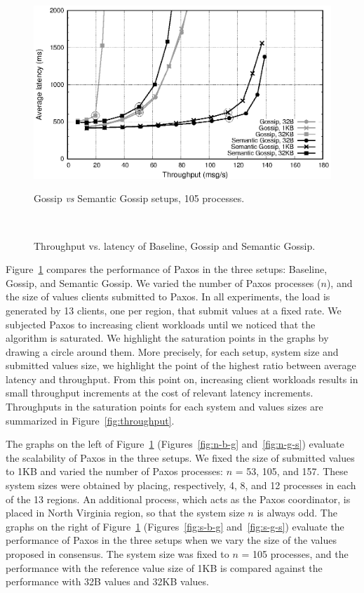 \begin{figure}[!htbp]
\includegraphics[width=\columnwidth]{figures/lat-th-size-gossip-semantic.eps}
\caption{Gossip {\em vs} Semantic Gossip setups, 105 processes.}
\label{fig:s-g-s}
\
\caption{Throughput vs. latency of Baseline, Gossip and Semantic Gossip.}
\label{fig:overall}
\end{figure}

Figure~\ref{fig:overall} compares the performance of Paxos in the three setups:
Baseline, Gossip, and Semantic Gossip.
%
We varied the number of Paxos processes ($n$), and the size of values clients
submitted to Paxos.
%
In all experiments, the load is generated by 13 clients, one per region, that
submit values at a fixed rate.
%
We subjected Paxos to increasing client workloads until we noticed that the
algorithm is saturated.
%
We highlight the saturation points in the graphs by drawing a circle around
them.
More precisely, for each setup, system size and submitted values size, we
highlight the point of the highest ratio between average latency and throughput.
%
From this point on, increasing client workloads results in small throughput
increments at the cost of relevant latency increments.
%
Throughputs in the saturation points for each system and values sizes are
summarized in Figure~\ref{fig:throughput}.

The graphs on the left of Figure~\ref{fig:overall} (Figures~\ref{fig:n-b-g}
and~\ref{fig:n-g-s}) evaluate the scalability of Paxos in the three setups.
We fixed the size of submitted values to 1KB and varied the number of
Paxos processes: $n$ = 53, 105, and 157.
These system sizes were obtained by placing, respectively, 4, 8, and 12
processes in each of the 13 regions.
An additional process, which acts as the Paxos coordinator, is placed in North
Virginia region, so that the system size $n$ is always odd.
%
The graphs on the right of Figure~\ref{fig:overall} (Figures~\ref{fig:s-b-g}
and~\ref{fig:s-g-s}) evaluate the performance of Paxos in the three setups when
we vary the size of the values proposed in consensus.
The system size was fixed to $n$ = 105 processes, and the performance with the
reference value size of 1KB is compared against the performance with 32B values
and 32KB values.

